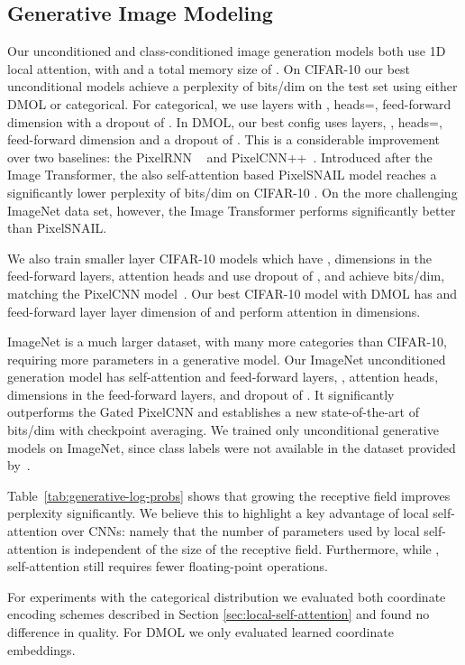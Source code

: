 \documentclass{article}
\begin{document}
\subsection{Generative Image Modeling}
Our unconditioned and class-conditioned image generation models both use 1D local attention, with  and a total memory size of .
On CIFAR-10 our best unconditional models achieve a perplexity of  bits/dim on the test set using either DMOL or categorical. For categorical, we use  layers with , heads=, feed-forward dimension  with a dropout of . In DMOL, our best config uses  layers, , heads=, feed-forward dimension  and a dropout of . This is a considerable improvement over two baselines: the PixelRNN ~\cite{PixelRNN} and PixelCNN++~\cite{PixelCNNpp}. Introduced after the Image Transformer, the also self-attention based PixelSNAIL model reaches a significantly lower perplexity of  bits/dim on CIFAR-10 \cite{chen2017pixelsnail}. On the more challenging ImageNet data set, however, the Image Transformer performs significantly better than PixelSNAIL.


We also train smaller  layer CIFAR-10 models which have ,  dimensions in the feed-forward layers,  attention heads and use dropout of , and achieve  bits/dim, matching the PixelCNN model~\cite{PixelRNN}. Our best CIFAR-10 model with DMOL has  and feed-forward layer layer dimension of  and perform attention in  dimensions.

ImageNet is a much larger dataset, with many more categories than CIFAR-10, requiring more parameters in a generative model. Our ImageNet unconditioned generation model has  self-attention and feed-forward layers, ,  attention heads,  dimensions in the feed-forward layers, and dropout of . It significantly outperforms the Gated PixelCNN and establishes a new state-of-the-art of  bits/dim with checkpoint averaging. We trained only unconditional generative models on ImageNet, since class labels were not available in the dataset provided by~\cite{PixelRNN}.

Table~\ref{tab:generative-log-probs} shows that growing the receptive field improves perplexity significantly. We believe this to highlight a key advantage of local self-attention over CNNs: namely that the number of parameters used by local self-attention is independent of the size of the receptive field. Furthermore, while , self-attention still requires fewer floating-point operations.

For experiments with the categorical distribution we evaluated both coordinate encoding schemes described in Section \ref{sec:local-self-attention} and found no difference in quality. For DMOL we only evaluated learned coordinate embeddings.
\end{document}
